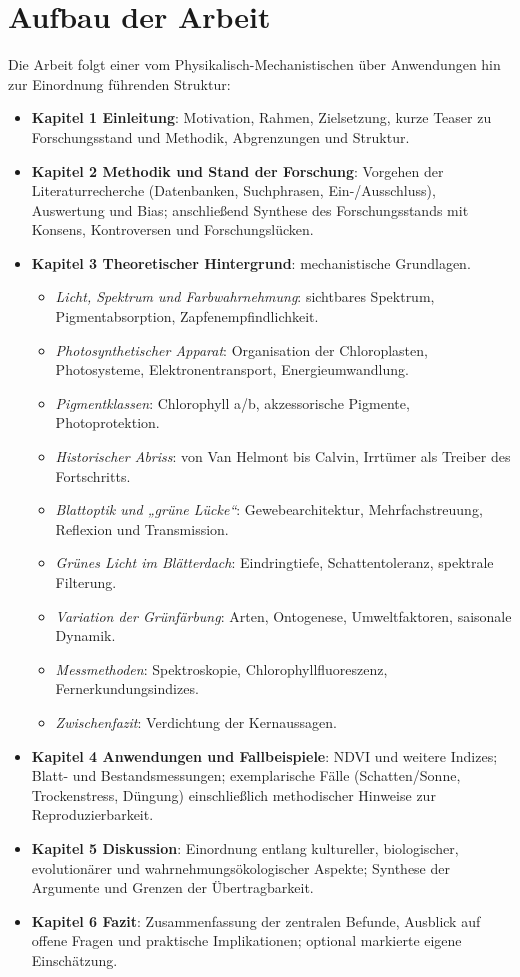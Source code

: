 \section{Aufbau der Arbeit}
Die Arbeit folgt einer vom Physikalisch-Mechanistischen über Anwendungen hin zur Einordnung führenden Struktur:
\begin{itemize}[leftmargin=2em]
  \item \textbf{Kapitel 1 Einleitung}: Motivation, Rahmen, Zielsetzung, kurze Teaser zu Forschungsstand und Methodik, Abgrenzungen und Struktur.
  \item \textbf{Kapitel 2 Methodik und Stand der Forschung}: Vorgehen der Literaturrecherche (Datenbanken, Suchphrasen, Ein-/Ausschluss), Auswertung und Bias; anschließend Synthese des Forschungsstands mit Konsens, Kontroversen und Forschungslücken.
  \item \textbf{Kapitel 3 Theoretischer Hintergrund}: mechanistische Grundlagen.
  \begin{itemize}
    \item \textit{Licht, Spektrum und Farbwahrnehmung}: sichtbares Spektrum, Pigmentabsorption, Zapfenempfindlichkeit.
    \item \textit{Photosynthetischer Apparat}: Organisation der Chloroplasten, Photosysteme, Elektronentransport, Energieumwandlung.
    \item \textit{Pigmentklassen}: Chlorophyll a/b, akzessorische Pigmente, Photoprotektion.
    \item \textit{Historischer Abriss}: von Van Helmont bis Calvin, Irrtümer als Treiber des Fortschritts.
    \item \textit{Blattoptik und „grüne Lücke“}: Gewebearchitektur, Mehrfachstreuung, Reflexion und Transmission.
    \item \textit{Grünes Licht im Blätterdach}: Eindringtiefe, Schattentoleranz, spektrale Filterung.
    \item \textit{Variation der Grünfärbung}: Arten, Ontogenese, Umweltfaktoren, saisonale Dynamik.
    \item \textit{Messmethoden}: Spektroskopie, Chlorophyllfluoreszenz, Fernerkundungsindizes.
    \item \textit{Zwischenfazit}: Verdichtung der Kernaussagen.
  \end{itemize}
  \item \textbf{Kapitel 4 Anwendungen und Fallbeispiele}: NDVI und weitere Indizes; Blatt- und Bestandsmessungen; exemplarische Fälle (Schatten/Sonne, Trockenstress, Düngung) einschließlich methodischer Hinweise zur Reproduzierbarkeit.
  \item \textbf{Kapitel 5 Diskussion}: Einordnung entlang kultureller, biologischer, evolutionärer und wahrnehmungsökologischer Aspekte; Synthese der Argumente und Grenzen der Übertragbarkeit.
  \item \textbf{Kapitel 6 Fazit}: Zusammenfassung der zentralen Befunde, Ausblick auf offene Fragen und praktische Implikationen; optional markierte eigene Einschätzung.
\end{itemize}
